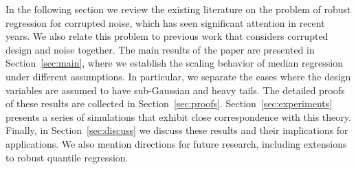 In the following section we review the existing literature on the problem of robust regression for corrupted noise, which has seen significant attention in recent years. We also relate this problem to previous work that considers corrupted design and noise together. The main results of the paper are presented in Section~\ref{sec:main}, where we establish the scaling behavior of median regression under different assumptions. In particular, we separate the cases where the design variables are assumed to have sub-Gaussian and heavy tails. The detailed proofs of these results are collected in Section~\ref{sec:proofs}. Section~\ref{sec:experiments} presents a series of simulations that exhibit close correspondence with this theory. Finally, in Section~\ref{sec:discuss} we discuss these results and their implications for applications. We also mention directions for future research, including extensions to robust quantile regression.

